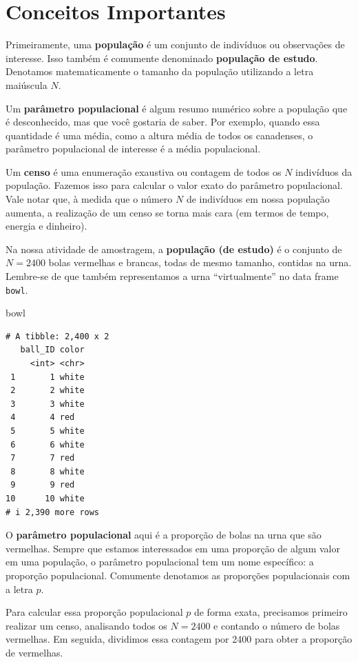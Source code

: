 \documentclass[
  letterpaper,
  DIV=11,
  numbers=noendperiod]{scrreprt}
\newenvironment{Shaded}{\begin{snugshade}}{\end{snugshade}}
\newcommand{\NormalTok}[1]{\textcolor[rgb]{0.00,0.23,0.31}{#1}}
\begin{document}
\section{Conceitos Importantes}\label{conceitos-importantes}

Primeiramente, uma \textbf{população} é um conjunto de indivíduos ou
observações de interesse. Isso também é comumente denominado
\textbf{população de estudo}. Denotamos matematicamente o tamanho da
população utilizando a letra maiúscula \(N\).

Um \textbf{parâmetro populacional} é algum resumo numérico sobre a
população que é desconhecido, mas que você gostaria de saber. Por
exemplo, quando essa quantidade é uma média, como a altura média de
todos os canadenses, o parâmetro populacional de interesse é a média
populacional.

Um \textbf{censo} é uma enumeração exaustiva ou contagem de todos os
\(N\) indivíduos da população. Fazemos isso para calcular o valor exato
do parâmetro populacional. Vale notar que, à medida que o número \(N\)
de indivíduos em nossa população aumenta, a realização de um censo se
torna mais cara (em termos de tempo, energia e dinheiro).

Na nossa atividade de amostragem, a \textbf{população (de estudo)} é o
conjunto de \(N = 2400\) bolas vermelhas e brancas, todas de mesmo
tamanho, contidas na urna. Lembre-se de que também representamos a urna
``virtualmente'' no data frame \texttt{bowl}.

\begin{Shaded}
\begin{Highlighting}[]
\NormalTok{bowl}
\end{Highlighting}
\end{Shaded}

\begin{verbatim}
# A tibble: 2,400 x 2
   ball_ID color
     <int> <chr>
 1       1 white
 2       2 white
 3       3 white
 4       4 red  
 5       5 white
 6       6 white
 7       7 red  
 8       8 white
 9       9 red  
10      10 white
# i 2,390 more rows
\end{verbatim}

O \textbf{parâmetro populacional} aqui é a proporção de bolas na urna
que são vermelhas. Sempre que estamos interessados em uma proporção de
algum valor em uma população, o parâmetro populacional tem um nome
específico: a proporção populacional. Comumente denotamos as proporções
populacionais com a letra \(p\).

Para calcular essa proporção populacional \(p\) de forma exata,
precisamos primeiro realizar um censo, analisando todos os \(N = 2400\)
e contando o número de bolas vermelhas. Em seguida, dividimos essa
contagem por 2400 para obter a proporção de vermelhas.
\end{document}
